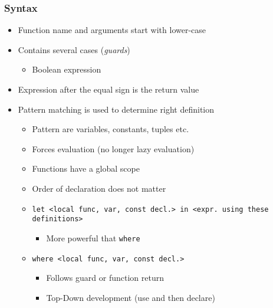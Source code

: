 \subsubsection{Syntax}
\begin{itemize}
        \begin{itemize}
            \item Function name and arguments start with lower-case
            \item Contains several cases (\textit{guards})
                \begin{itemize}
                    \item Boolean expression
                \end{itemize}
            \item Expression after the equal sign is the return value
            \item Pattern matching is used to determine right definition
                \begin{itemize}
                    \item Pattern are variables, constants, tuples etc.
                    \item Forces evaluation (no longer lazy evaluation)
                \end{itemize}
                \begin{itemize}
                    \item Functions have a global scope
                    \item Order of declaration does not matter
                    \item \verb+let <local func, var, const decl.> in <expr. using these definitions>+
                        \begin{itemize}
                            \item More powerful that \verb+where+
                        \end{itemize}
                    \item \verb+where <local func, var, const decl.>+
                        \begin{itemize}
                            \item Follows guard or function return
                            \item Top-Down development (use and then declare)
                        \end{itemize}
                \end{itemize}

\end{itemize}
\end{itemize}
